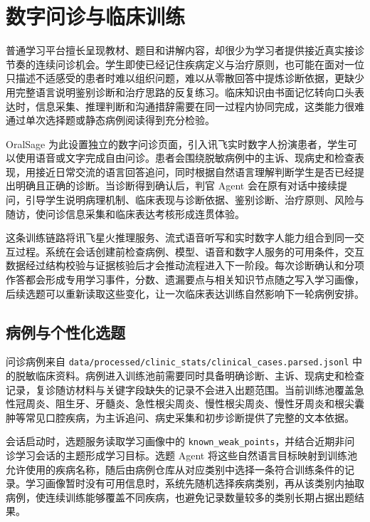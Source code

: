 
\chapter{数字问诊与临床训练}
\label{sec:digital-consultation}

普通学习平台擅长呈现教材、题目和讲解内容，却很少为学习者提供接近真实接诊节奏的连续问诊机会。学生即使已经记住疾病定义与治疗原则，也可能在面对一位只描述不适感受的患者时难以组织问题，难以从零散回答中提炼诊断依据，更缺少用完整语言说明鉴别诊断和治疗思路的反复练习。临床知识由书面记忆转向口头表达时，信息采集、推理判断和沟通措辞需要在同一过程内协同完成，这类能力很难通过单次选择题或静态病例阅读得到充分检验。

OralSage 为此设置独立的数字问诊页面，引入讯飞实时数字人扮演患者，学生可以使用语音或文字完成自由问诊。患者会围绕脱敏病例中的主诉、现病史和检查表现，用接近日常交流的语言回答追问，同时根据自然语言理解判断学生是否已经提出明确且正确的诊断。当诊断得到确认后，判官 Agent 会在原有对话中接续提问，引导学生说明病理机制、临床表现与诊断依据、鉴别诊断、治疗原则、风险与随访，使问诊信息采集和临床表达考核形成连贯体验。

这条训练链路将讯飞星火推理服务、流式语音听写和实时数字人能力组合到同一交互过程。系统在会话创建前检查病例、模型、语音和数字人服务的可用条件，交互数据经过结构校验与证据核验后才会推动流程进入下一阶段。每次诊断确认和分项作答都会形成专用学习事件，分数、遗漏要点与相关知识节点随之写入学习画像，后续选题可以重新读取这些变化，让一次临床表达训练自然影响下一轮病例安排。

\section{病例与个性化选题}

问诊病例来自 \texttt{data/processed/clinic\_stats/clinical\_cases.parsed.jsonl} 中的脱敏临床资料。病例进入训练池前需要同时具备明确诊断、主诉、现病史和检查记录，复诊随访材料与关键字段缺失的记录不会进入出题范围。当前训练池覆盖急性冠周炎、阻生牙、牙髓炎、急性根尖周炎、慢性根尖周炎、慢性牙周炎和根尖囊肿等常见口腔疾病，为主诉追问、病史采集和初步诊断提供了完整的文本依据。

会话启动时，选题服务读取学习画像中的 \texttt{known\_weak\_points}，并结合近期非问诊学习会话的主题形成学习目标。选题 Agent 将这些自然语言目标映射到训练池允许使用的疾病名称，随后由病例仓库从对应类别中选择一条符合训练条件的记录。学习画像暂时没有可用信息时，系统先随机选择疾病类别，再从该类别内抽取病例，使连续训练能够覆盖不同疾病，也避免记录数量较多的类别长期占据出题结果。


